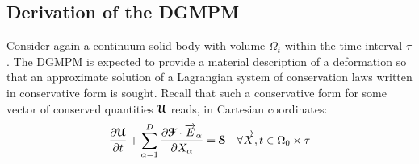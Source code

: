 

\subsection{Derivation of the DGMPM}
Consider again a continuum solid body with volume $\Omega_t$ within the time interval $\tau$. The DGMPM is expected to provide a material description of a deformation so that an approximate solution of a Lagrangian system of conservation laws written in conservative form is sought. Recall that such a conservative form for some vector of conserved quantities ${\boldsymbol{\mathcal{U}}}$ reads, in Cartesian coordinates:
\begin{equation}
  \label{eq:conservative_form}
  \frac{\partial {\boldsymbol{\mathcal{U}}}}{\partial t} + \sum_{\alpha=1}^D \frac{\partial {\boldsymbol{\mathcal{F}}}\cdot {\overrightarrow{E}}_\alpha}{\partial X_\alpha} = {\boldsymbol{\mathcal{S}}} \quad \forall {\overrightarrow{X}},t \in \Omega_0 \times \tau
\end{equation}
